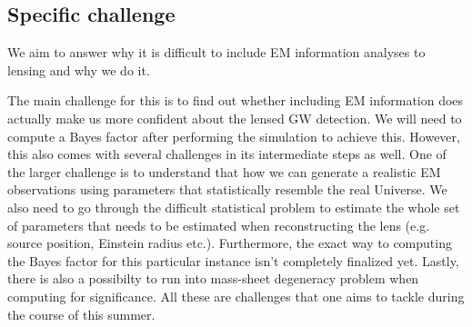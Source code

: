 \documentclass[pdflatex,sn-mathphys-num]{sn-jnl}%
\theoremstyle{thmstyleone}%
\theoremstyle{thmstyletwo}%
\theoremstyle{thmstylethree}%
\begin{document}
\subsection{Specific challenge}
We aim to answer why it is difficult to include EM information analyses to lensing and why we do it.

The main challenge for this is to find out whether including EM information does actually make us more confident about the lensed GW detection. 
We will need to compute a Bayes factor after performing the simulation to achieve this. 
However, this also comes with several challenges in its intermediate steps as well. 
One of the larger challenge is to understand that how we can generate a realistic EM observations using parameters that statistically resemble the real Universe. 
We also need to go through the difficult statistical problem to estimate the whole set of parameters that needs to be estimated when reconstructing the lens (e.g. 
source position, Einstein radius etc.). 
Furthermore, the exact way to computing the Bayes factor for this particular instance isn't completely finalized yet. 
Lastly, there is also a possibilty to run into mass-sheet degeneracy problem when computing for significance. 
All these are challenges that one aims to tackle during the course of this summer.
\end{document}
